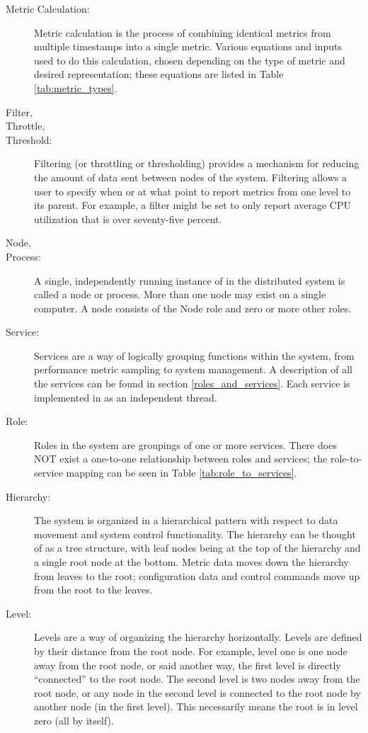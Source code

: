\begin{description}
\item[Metric Calculation:]
Metric calculation is the process of combining identical metrics from multiple timestamps into a single metric. Various
equations and inputs used to do this calculation, chosen depending on the type of metric and desired representation;
these equations are listed in Table \ref{tab:metric_types}.

\item[Filter,]
\item[Throttle,]
\item[Threshold:]
Filtering (or throttling or thresholding) provides a mechanism for reducing the amount of data sent between nodes of the
system. Filtering allows a user to specify when or at what point to report metrics from one level to its parent. For
example, a filter might be set to only report average CPU utilization that is over seventy-five percent. 

\item[\dcamp Node,]
\item[\dcamp Process:]
A single, independently running instance of \dcamp in the distributed system is called a \dcamp node or process. More
than one node may exist on a single computer. A node consists of the Node role and zero or more other \dcamp roles. 

\item[\dcamp Service:]
Services are a way of logically grouping functions within the \dcamp system, from performance metric sampling to \dcamp
system management. A description of all the \dcamp services can be found in section \ref{roles_and_services}. Each
service is implemented in \dcamp as an independent thread.

\item[\dcamp Role:]
Roles in the \dcamp system are groupings of one or more \dcamp services. There does NOT exist a one-to-one
relationship between roles and services; the \dcamp role-to-service mapping can be seen in Table
\ref{tab:role_to_services}.

\item[\dcamp Hierarchy:]
The \dcamp system is organized in a hierarchical pattern with respect to data movement and system control functionality.
The hierarchy can be thought of as a tree structure, with leaf nodes being at the top of the hierarchy and a single root
node at the bottom. Metric data moves down the hierarchy from leaves to the root; configuration data and control
commands move up from the root to the leaves. 

\item[\dcamp Level:]
Levels are a way of organizing the \dcamp hierarchy horizontally. Levels are defined by their distance from the root
node. For example, level one is one node away from the root node, or said another way, the first level is directly
``connected'' to the root node. The second level is two nodes away from the root node, or any node in the second level is
connected to the root node by another node (in the first level). This necessarily means the root is in level zero (all
by itself). 


\end{description}
